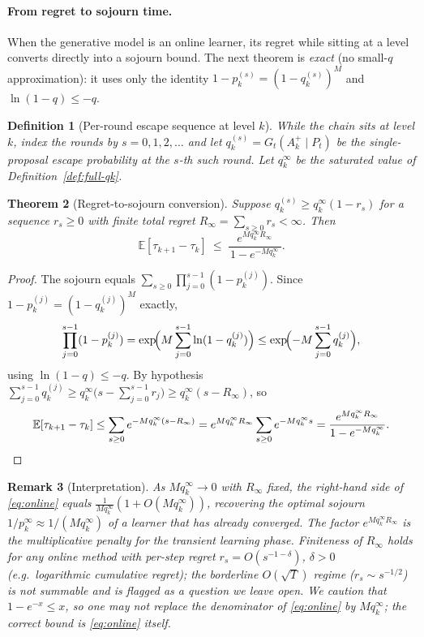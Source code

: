 \documentclass[11pt,a4paper]{article}
\newtheorem{theorem}{Theorem}[section]
\newtheorem{definition}[theorem]{Definition}
\newtheorem{remark}[theorem]{Remark}
\newcommand{\E}{\mathbb{E}}
\newcommand{\Akp}{A_k^{+}}
\begin{document}
\paragraph{From regret to sojourn time.}

When the generative model is an online learner, its regret while sitting
at a level converts directly into a sojourn bound.  The next theorem is
\emph{exact} (no small-$q$ approximation): it uses only the identity
$1-p_k^{(s)}=(1-q_k^{(s)})^M$ and $\ln(1-q)\le-q$.

\begin{definition}[Per-round escape sequence at level $k$]
  While the chain sits at level $k$, index the rounds by $s=0,1,2,\dots$
  and let $q_k^{(s)}=G_{t}(\Akp\mid P_t)$ be the single-proposal escape
  probability at the $s$-th such round.  Let $q_k^\infty$ be the
  saturated value of Definition~\ref{def:full-qk}.
\end{definition}

\begin{theorem}[Regret-to-sojourn conversion]\label{thm:online}
  Suppose $q_k^{(s)}\ge q_k^\infty(1-r_s)$ for a sequence $r_s\ge0$ with
  finite total regret $R_\infty=\sum_{s\ge0}r_s<\infty$.  Then
  \begin{equation}
    \E[\tau_{k+1}-\tau_k]
    \ \le\
    \frac{e^{Mq_k^\infty R_\infty}}{\,1-e^{-Mq_k^\infty}\,}.
    \label{eq:online}
  \end{equation}
\end{theorem}

\begin{proof}
  The sojourn equals $\sum_{s\ge0}\prod_{j=0}^{s-1}(1-p_k^{(j)})$.  Since
  $1-p_k^{(j)}=(1-q_k^{(j)})^M$ exactly,
  \[
    \prod_{j=0}^{s-1}(1-p_k^{(j)})
    =\exp\!\Bigl(M\sum_{j=0}^{s-1}\ln(1-q_k^{(j)})\Bigr)
    \le\exp\!\Bigl(-M\sum_{j=0}^{s-1}q_k^{(j)}\Bigr),
  \]
  using $\ln(1-q)\le-q$.  By hypothesis
  $\sum_{j=0}^{s-1}q_k^{(j)}\ge q_k^\infty\bigl(s-\sum_{j=0}^{s-1}r_j\bigr)
  \ge q_k^\infty(s-R_\infty)$, so
  \[
    \E[\tau_{k+1}-\tau_k]
    \le\sum_{s\ge0}e^{-Mq_k^\infty(s-R_\infty)}
    =e^{Mq_k^\infty R_\infty}\sum_{s\ge0}e^{-Mq_k^\infty s}
    =\frac{e^{Mq_k^\infty R_\infty}}{1-e^{-Mq_k^\infty}}.\qedhere
  \]
\end{proof}

\begin{remark}[Interpretation]\label{rem:online}
  As $Mq_k^\infty\to0$ with $R_\infty$ fixed, the right-hand side of
  \eqref{eq:online} equals $\frac1{Mq_k^\infty}(1+O(Mq_k^\infty))$,
  recovering the optimal sojourn $1/p_k^\infty\approx1/(Mq_k^\infty)$ of
  a learner that has already converged.  The factor $e^{Mq_k^\infty
  R_\infty}$ is the multiplicative penalty for the transient learning
  phase.  Finiteness of $R_\infty$ holds for any online method with
  per-step regret $r_s=O(s^{-1-\delta})$, $\delta>0$ (e.g.\ logarithmic
  cumulative regret); the borderline $O(\sqrt T)$ regime
  ($r_s\sim s^{-1/2}$) is \emph{not} summable and is flagged as
  a question we leave open.  We caution that
  $1-e^{-x}\le x$, so one may \emph{not} replace the denominator of
  \eqref{eq:online} by $Mq_k^\infty$; the correct bound is
  \eqref{eq:online} itself.
\end{remark}
\end{document}
